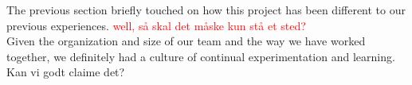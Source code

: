 The previous section briefly touched on how this project has been different to our previous experiences. \textcolor{red}{ well, så skal det måske kun stå et sted?} \\

Given the organization and size of our team and the way we have worked together, we definitely had a culture of continual experimentation and learning. Kan vi godt claime det? 
